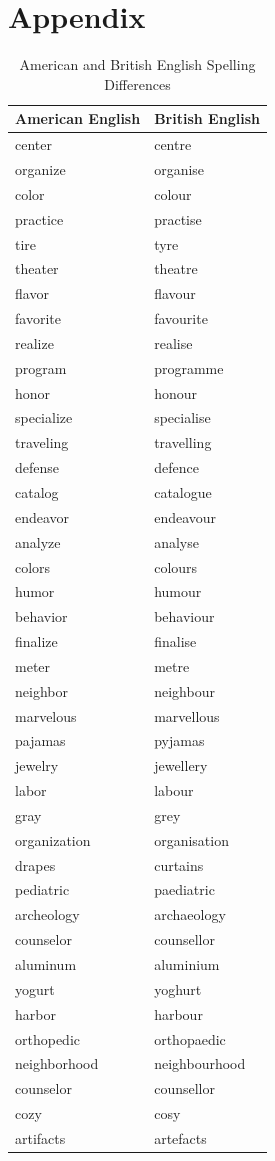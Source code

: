 \documentclass{article}
\begin{document}
\section{Appendix}
\begin{table}[h]
\centering
\begin{tabular}{|l|l|}
\hline
\textbf{American English} & \textbf{British English} \\ \hline
center & centre \\
organize & organise \\
color & colour \\
practice & practise \\
tire & tyre \\
theater & theatre \\
flavor & flavour \\
favorite & favourite \\
realize & realise \\
program & programme \\
honor & honour \\
specialize & specialise \\
traveling & travelling \\
defense & defence \\
catalog & catalogue \\
endeavor & endeavour \\
analyze & analyse \\
colors & colours \\
humor & humour \\
behavior & behaviour \\
finalize & finalise \\
meter & metre \\
neighbor & neighbour \\
marvelous & marvellous \\
pajamas & pyjamas \\
jewelry & jewellery \\
labor & labour \\
gray & grey \\
organization & organisation \\
drapes & curtains \\
pediatric & paediatric \\
archeology & archaeology \\
counselor & counsellor \\
aluminum & aluminium \\
yogurt & yoghurt \\
harbor & harbour \\
orthopedic & orthopaedic \\
neighborhood & neighbourhood \\
counselor & counsellor \\
cozy & cosy \\
artifacts & artefacts \\ \hline
\end{tabular}
\caption{American and British English Spelling Differences}
\label{table:spelling_differences}
\end{table}
\end{document}
